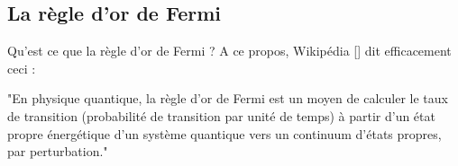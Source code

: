 \documentclass[12pt,openany,a4paper, titlepage]{article}
\theoremstyle{definition}
\theoremstyle{definition}
\theoremstyle{definition}
\theoremstyle{definition}
\theoremstyle{definition}
\begin{document}
\vspace{3mm}
\begin{tcolorbox}[colback=gray!5!white,
                  colframe=gray!80!white,
                  title= Postulat 3 : Principe de quantification ]

\end{tcolorbox}
\vspace{3mm}

\vspace{3mm}
\begin{tcolorbox}[colback=gray!5!white,
                  colframe=gray!80!white,
                  title= Postulat 4 : Principe de décomposition spectrale ]

\end{tcolorbox}
\vspace{3mm}

\vspace{3mm}
\begin{tcolorbox}[colback=gray!5!white,
                  colframe=gray!80!white,
                  title= Postulat 5 : Principe de réduction du paquet d’onde ]

\end{tcolorbox}
\vspace{3mm}

\vspace{3mm}
\begin{tcolorbox}[colback=gray!5!white,
                  colframe=gray!80!white,
                  title= Postulat 6 : Evolution d'un système dans le temps ]

\end{tcolorbox}
\vspace{3mm}


\subsection{La règle d'or de Fermi} 

Qu'est ce que la règle d'or de Fermi ? A ce propos, Wikipédia [] dit efficacement ceci : \\

\begin{it}
    "En physique quantique, la règle d'or de Fermi est un moyen de calculer le taux de transition (probabilité de transition par unité de temps) à partir d'un état propre énergétique d'un système quantique vers un continuum d'états propres, par perturbation."
\end{it}\\
\end{document}
